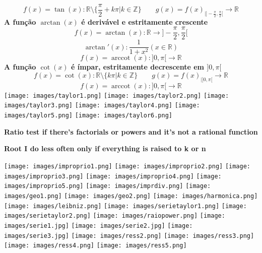 \documentclass[a4paper]{article}
\DeclareMathOperator{\arccot}{arccot}
\begin{document}
    \centering
    \[f(x)=\tan(x): \mathbb{R} \setminus \{\frac{\pi}{2} +k\pi| k \in \mathbb{Z}\} \qquad  g(x)=f(x)_{|]-\frac{\pi}{2},\frac{\pi}{2}[}\rightarrow \mathbb{R}\]
    \textbf{A função $\arctan(x)$ é derivável e estritamente crescente}
    \[f(x)=\arctan(x): \mathbb{R} \rightarrow  ]-\frac{\pi}{2},\frac{\pi}{2}[\]
    \[\arctan'(x): \frac{1}{1+x^2} (x \in \mathbb{R})\]
    \centering
    \[f(x)=\arccot(x):]0,\pi[ \rightarrow \mathbb{R}\]
    \textbf{A função $\cot(x)$ é ímpar, estritamente decrescente em $]0,\pi[$}
    \[f(x)=\cot(x): \mathbb{R} \setminus \{k\pi | k \in \mathbb{Z}\} \qquad  g(x)=f(x)_{|]0,\pi[}\rightarrow \mathbb{R}\]
    \centering
  \[f(x)=\arccot(x):]0,\pi[ \rightarrow \mathbb{R}\]
     \centering
  \texttt{[image: images/taylor1.png]}
  \texttt{[image: images/taylor2.png]}
  \texttt{[image: images/taylor3.png]}
  \texttt{[image: images/taylor4.png]}
  \texttt{[image: images/taylor5.png]}
  \texttt{[image: images/taylor6.png]}
  
  \textbf{Ratio test if there’s factorials or powers and it’s not a rational function}
  
  \textbf{Root I do less often only if everything is raised to k or n}
  
\texttt{[image: images/improprio1.png]}
\texttt{[image: images/improprio2.png]}
\texttt{[image: images/improprio3.png]}
\texttt{[image: images/improprio4.png]}
\texttt{[image: images/improprio5.png]}
\texttt{[image: images/imprdiv.png]}
\texttt{[image: images/geo1.png]}
\texttt{[image: images/geo2.png]}
\texttt{[image: images/harmonica.png]}
\texttt{[image: images/leibniz.png]}
\texttt{[image: images/serietaylor1.png]}
\texttt{[image: images/serietaylor2.png]}
\texttt{[image: images/raiopower.png]}
\texttt{[image: images/serie1.jpg]}
\texttt{[image: images/serie2.jpg]}
\texttt{[image: images/serie3.jpg]}
\texttt{[image: images/ress2.png]}
\texttt{[image: images/ress3.png]}
\texttt{[image: images/ress4.png]}
\texttt{[image: images/ress5.png]}
\end{document}
